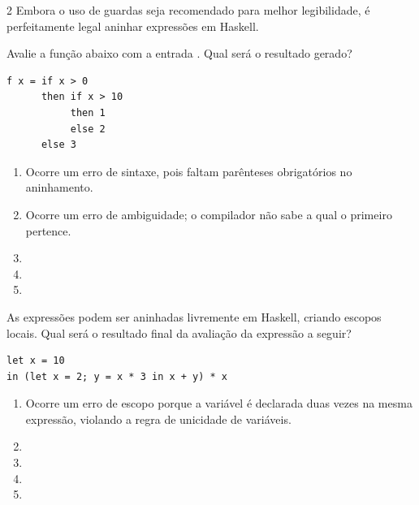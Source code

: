 \documentclass[a4paper,10pt,brazil]{article}
\begin{document}
\begin{multicols}{2}
Embora o uso de guardas seja recomendado para melhor legibilidade, é perfeitamente legal aninhar expressões  em Haskell. 

Avalie a função abaixo com a entrada . Qual será o resultado gerado?
\begin{verbatim}
f x = if x > 0
      then if x > 10
           then 1
           else 2
      else 3
\end{verbatim}

\begin{enumerate}
  \item Ocorre um erro de sintaxe, pois faltam parênteses obrigatórios no aninhamento.

  \item Ocorre um erro de ambiguidade; o compilador não sabe a qual  o primeiro  pertence.

  \item {}

  \item {}

  \item {}


\end{enumerate}

As expressões  podem ser aninhadas livremente em Haskell, criando escopos locais. Qual será o resultado final da avaliação da expressão a seguir?
\begin{verbatim}
let x = 10 
in (let x = 2; y = x * 3 in x + y) * x
\end{verbatim}

\begin{enumerate}
  \item Ocorre um erro de escopo porque a variável  é declarada duas vezes na mesma expressão, violando a regra de unicidade de variáveis.

  \item {}

  \item {}

  \item {}

  \item {}


\end{enumerate}


\end{multicols}
\end{document}
